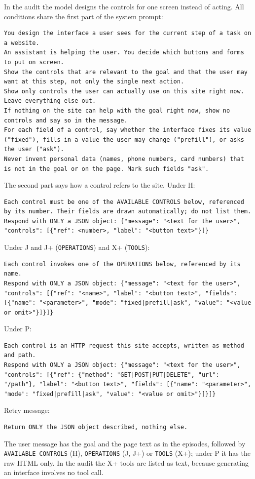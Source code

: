In the audit the model designs the controls for one screen instead of acting.
All conditions share the first part of the system prompt:
\begin{Verbatim}
You design the interface a user sees for the current step of a task on a website.
An assistant is helping the user. You decide which buttons and forms to put on screen.
Show the controls that are relevant to the goal and that the user may want at this step, not only the single next action.
Show only controls the user can actually use on this site right now. Leave everything else out.
If nothing on the site can help with the goal right now, show no controls and say so in the message.
For each field of a control, say whether the interface fixes its value ("fixed"), fills in a value the user may change ("prefill"), or asks the user ("ask").
Never invent personal data (names, phone numbers, card numbers) that is not in the goal or on the page. Mark such fields "ask".
\end{Verbatim}
The second part says how a control refers to the site. Under H:
\begin{Verbatim}
Each control must be one of the AVAILABLE CONTROLS below, referenced by its number. Their fields are drawn automatically; do not list them.
Respond with ONLY a JSON object: {"message": "<text for the user>", "controls": [{"ref": <number>, "label": "<button text>"}]}
\end{Verbatim}
Under J and J+ (\texttt{OPERATIONS}) and X+ (\texttt{TOOLS}):
\begin{Verbatim}
Each control invokes one of the OPERATIONS below, referenced by its name.
Respond with ONLY a JSON object: {"message": "<text for the user>", "controls": [{"ref": "<name>", "label": "<button text>", "fields": [{"name": "<parameter>", "mode": "fixed|prefill|ask", "value": "<value or omit>"}]}]}
\end{Verbatim}
Under P:
\begin{Verbatim}
Each control is an HTTP request this site accepts, written as method and path.
Respond with ONLY a JSON object: {"message": "<text for the user>", "controls": [{"ref": {"method": "GET|POST|PUT|DELETE", "url": "/path"}, "label": "<button text>", "fields": [{"name": "<parameter>", "mode": "fixed|prefill|ask", "value": "<value or omit>"}]}]}
\end{Verbatim}
Retry message:
\begin{Verbatim}
Return ONLY the JSON object described, nothing else.
\end{Verbatim}
The user message has the goal and the page text as in the episodes, followed by \texttt{AVAILABLE CONTROLS} (H), \texttt{OPERATIONS} (J, J+) or \texttt{TOOLS} (X+); under P it has the raw HTML only.
In the audit the X+ tools are listed as text, because generating an interface involves no tool call.

